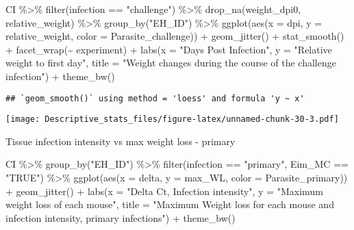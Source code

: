 \documentclass[
]{article}
\newenvironment{Shaded}{\begin{snugshade}}{\end{snugshade}}
\newcommand{\AttributeTok}[1]{\textcolor[rgb]{0.77,0.63,0.00}{#1}}
\newcommand{\FunctionTok}[1]{\textcolor[rgb]{0.00,0.00,0.00}{#1}}
\newcommand{\NormalTok}[1]{#1}
\newcommand{\SpecialCharTok}[1]{\textcolor[rgb]{0.00,0.00,0.00}{#1}}
\newcommand{\StringTok}[1]{\textcolor[rgb]{0.31,0.60,0.02}{#1}}
\begin{document}
\begin{Shaded}
\begin{Highlighting}[]
\NormalTok{CI }\SpecialCharTok{\%\textgreater{}\%} 
    \FunctionTok{filter}\NormalTok{(infection }\SpecialCharTok{==} \StringTok{"challenge"}\NormalTok{) }\SpecialCharTok{\%\textgreater{}\%}
    \FunctionTok{drop\_na}\NormalTok{(weight\_dpi0, relative\_weight) }\SpecialCharTok{\%\textgreater{}\%}
    \FunctionTok{group\_by}\NormalTok{(}\StringTok{"EH\_ID"}\NormalTok{) }\SpecialCharTok{\%\textgreater{}\%}
    \FunctionTok{ggplot}\NormalTok{(}\FunctionTok{aes}\NormalTok{(}\AttributeTok{x =}\NormalTok{ dpi, }\AttributeTok{y =}\NormalTok{ relative\_weight, }\AttributeTok{color =}\NormalTok{ Parasite\_challenge)) }\SpecialCharTok{+}
    \FunctionTok{geom\_jitter}\NormalTok{() }\SpecialCharTok{+}
    \FunctionTok{stat\_smooth}\NormalTok{() }\SpecialCharTok{+}
    \FunctionTok{facet\_wrap}\NormalTok{(}\SpecialCharTok{\textasciitilde{}}\NormalTok{ experiment) }\SpecialCharTok{+}
    \FunctionTok{labs}\NormalTok{(}\AttributeTok{x =} \StringTok{"Days Post Infection"}\NormalTok{, }\AttributeTok{y =} \StringTok{"Relative weight to first day"}\NormalTok{,}
         \AttributeTok{title =} \StringTok{"Weight changes during the course of the challenge infection"}\NormalTok{) }\SpecialCharTok{+}
    \FunctionTok{theme\_bw}\NormalTok{()}
\end{Highlighting}
\end{Shaded}

\begin{verbatim}
## `geom_smooth()` using method = 'loess' and formula 'y ~ x'
\end{verbatim}

\texttt{[image: Descriptive\_stats\_files/figure-latex/unnamed-chunk-30-3.pdf]}

Tissue infection intensity vs max weight loss - primary

\begin{Shaded}
\begin{Highlighting}[]
\NormalTok{CI  }\SpecialCharTok{\%\textgreater{}\%}
  \FunctionTok{group\_by}\NormalTok{(}\StringTok{"EH\_ID"}\NormalTok{) }\SpecialCharTok{\%\textgreater{}\%}
  \FunctionTok{filter}\NormalTok{(infection }\SpecialCharTok{==} \StringTok{"primary"}\NormalTok{, Eim\_MC }\SpecialCharTok{==} \StringTok{"TRUE"}\NormalTok{) }\SpecialCharTok{\%\textgreater{}\%}
  \FunctionTok{ggplot}\NormalTok{(}\FunctionTok{aes}\NormalTok{(}\AttributeTok{x =}\NormalTok{ delta, }\AttributeTok{y =}\NormalTok{ max\_WL, }\AttributeTok{color =}\NormalTok{ Parasite\_primary)) }\SpecialCharTok{+}
  \FunctionTok{geom\_jitter}\NormalTok{() }\SpecialCharTok{+}
  \FunctionTok{labs}\NormalTok{(}\AttributeTok{x =} \StringTok{"Delta Ct, Infection intensity"}\NormalTok{, }\AttributeTok{y =} \StringTok{"Maximum weight loss of each mouse"}\NormalTok{,}
       \AttributeTok{title =} \StringTok{"Maximum Weight loss for each mouse and infection intensity, }
\StringTok{       primary infections"}\NormalTok{) }\SpecialCharTok{+}
    \FunctionTok{theme\_bw}\NormalTok{()}
\end{Highlighting}
\end{Shaded}
\end{document}
